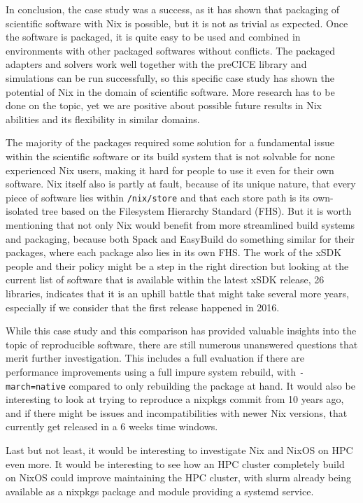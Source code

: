 \documentclass{eceasst}
\begin{document}
In conclusion, the case study was a success, as it has shown that packaging of scientific software with Nix is possible, but it is not as trivial as expected.
Once the software is packaged, it is quite easy to be used and combined in environments with other packaged softwares without conflicts.
The packaged adapters and solvers work well together with the preCICE library and simulations can be run successfully, so this specific case study has shown the potential of Nix in the domain of scientific software.
More research has to be done on the topic, yet we are positive about possible future results in Nix abilities and its flexibility in similar domains.

The majority of the packages required some solution for a fundamental issue within the scientific software or its build system that is not solvable for none experienced Nix users, making it hard for people to use it even for their own software.
Nix itself also is partly at fault, because of its unique nature, that every piece of software lies within \texttt{/nix/store} and that each store path is its own-isolated tree based on the Filesystem Hierarchy Standard (FHS).
But it is worth mentioning that not only Nix would benefit from more streamlined build systems and packaging, because both Spack and EasyBuild do something similar for their packages, where each package also lies in its own FHS.
The work of the xSDK people and their policy might be a step in the right direction but looking at the current list of software that is available within the latest xSDK release, 26 libraries, indicates that it is an uphill battle that might take several more years, especially if we consider that the first release happened in 2016.

While this case study and this comparison has provided valuable insights into the topic of reproducible software, there are still numerous unanswered questions that merit further investigation.
This includes a full evaluation if there are performance improvements using a full impure system rebuild, with \texttt{-march=native} compared to only rebuilding the package at hand.
It would also be interesting to look at trying to reproduce a nixpkgs commit from 10 years ago, and if there might be issues and incompatibilities with newer Nix versions, that currently get released in a 6 weeks time windows.

Last but not least, it would be interesting to investigate Nix and NixOS on HPC even more.
It would be interesting to see how an HPC cluster completely build on NixOS could improve maintaining the HPC cluster, with slurm already being available as a nixpkgs package and module providing a systemd service.
\end{document}
